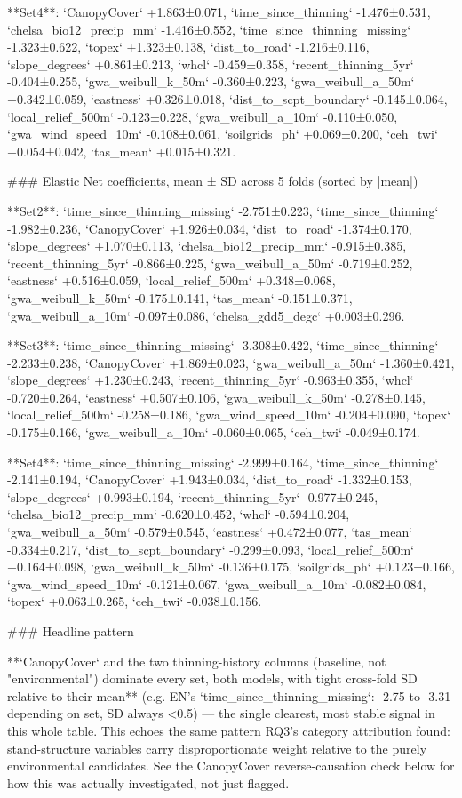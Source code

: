 **Set4**: `CanopyCover` +1.863±0.071, `time_since_thinning` -1.476±0.531, `chelsa_bio12_precip_mm`
-1.416±0.552, `time_since_thinning_missing` -1.323±0.622, `topex` +1.323±0.138, `dist_to_road`
-1.216±0.116, `slope_degrees` +0.861±0.213, `whcl` -0.459±0.358, `recent_thinning_5yr`
-0.404±0.255, `gwa_weibull_k_50m` -0.360±0.223, `gwa_weibull_a_50m` +0.342±0.059, `eastness`
+0.326±0.018, `dist_to_scpt_boundary` -0.145±0.064, `local_relief_500m` -0.123±0.228,
`gwa_weibull_a_10m` -0.110±0.050, `gwa_wind_speed_10m` -0.108±0.061, `soilgrids_ph`
+0.069±0.200, `ceh_twi` +0.054±0.042, `tas_mean` +0.015±0.321.

### Elastic Net coefficients, mean ± SD across 5 folds (sorted by |mean|)

**Set2**: `time_since_thinning_missing` -2.751±0.223, `time_since_thinning` -1.982±0.236,
`CanopyCover` +1.926±0.034, `dist_to_road` -1.374±0.170, `slope_degrees` +1.070±0.113,
`chelsa_bio12_precip_mm` -0.915±0.385, `recent_thinning_5yr` -0.866±0.225, `gwa_weibull_a_50m`
-0.719±0.252, `eastness` +0.516±0.059, `local_relief_500m` +0.348±0.068, `gwa_weibull_k_50m`
-0.175±0.141, `tas_mean` -0.151±0.371, `gwa_weibull_a_10m` -0.097±0.086, `chelsa_gdd5_degc`
+0.003±0.296.

**Set3**: `time_since_thinning_missing` -3.308±0.422, `time_since_thinning` -2.233±0.238,
`CanopyCover` +1.869±0.023, `gwa_weibull_a_50m` -1.360±0.421, `slope_degrees` +1.230±0.243,
`recent_thinning_5yr` -0.963±0.355, `whcl` -0.720±0.264, `eastness` +0.507±0.106,
`gwa_weibull_k_50m` -0.278±0.145, `local_relief_500m` -0.258±0.186, `gwa_wind_speed_10m`
-0.204±0.090, `topex` -0.175±0.166, `gwa_weibull_a_10m` -0.060±0.065, `ceh_twi` -0.049±0.174.

**Set4**: `time_since_thinning_missing` -2.999±0.164, `time_since_thinning` -2.141±0.194,
`CanopyCover` +1.943±0.034, `dist_to_road` -1.332±0.153, `slope_degrees` +0.993±0.194,
`recent_thinning_5yr` -0.977±0.245, `chelsa_bio12_precip_mm` -0.620±0.452, `whcl` -0.594±0.204,
`gwa_weibull_a_50m` -0.579±0.545, `eastness` +0.472±0.077, `tas_mean` -0.334±0.217,
`dist_to_scpt_boundary` -0.299±0.093, `local_relief_500m` +0.164±0.098, `gwa_weibull_k_50m`
-0.136±0.175, `soilgrids_ph` +0.123±0.166, `gwa_wind_speed_10m` -0.121±0.067, `gwa_weibull_a_10m`
-0.082±0.084, `topex` +0.063±0.265, `ceh_twi` -0.038±0.156.

### Headline pattern

**`CanopyCover` and the two thinning-history columns (baseline, not "environmental") dominate
every set, both models, with tight cross-fold SD relative to their mean** (e.g. EN's
`time_since_thinning_missing`: -2.75 to -3.31 depending on set, SD always <0.5) — the single
clearest, most stable signal in this whole table. This echoes the same pattern RQ3's category
attribution found: stand-structure variables carry disproportionate weight relative to the purely
environmental candidates. See the CanopyCover reverse-causation check below for how this was
actually investigated, not just flagged.

